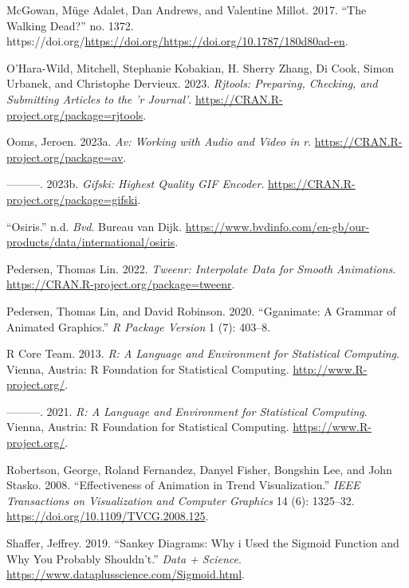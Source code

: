 \begin{CSLReferences}{1}{0}
\leavevmode{}%
McGowan, Müge Adalet, Dan Andrews, and Valentine Millot. 2017. {``The Walking Dead?''} no. 1372. https://doi.org/\url{https://doi.org/https://doi.org/10.1787/180d80ad-en}.

\leavevmode{}%
O'Hara-Wild, Mitchell, Stephanie Kobakian, H. Sherry Zhang, Di Cook, Simon Urbanek, and Christophe Dervieux. 2023. \emph{Rjtools: Preparing, Checking, and Submitting Articles to the 'r Journal'}. \url{https://CRAN.R-project.org/package=rjtools}.

\leavevmode{}%
Ooms, Jeroen. 2023a. \emph{Av: Working with Audio and Video in r}. \url{https://CRAN.R-project.org/package=av}.

\leavevmode{}%
---------. 2023b. \emph{Gifski: Highest Quality GIF Encoder}. \url{https://CRAN.R-project.org/package=gifski}.

\leavevmode{}%
{``Osiris.''} n.d. \emph{Bvd}. Bureau van Dijk. \url{https://www.bvdinfo.com/en-gb/our-products/data/international/osiris}.

\leavevmode{}%
Pedersen, Thomas Lin. 2022. \emph{Tweenr: Interpolate Data for Smooth Animations}. \url{https://CRAN.R-project.org/package=tweenr}.

\leavevmode{}%
Pedersen, Thomas Lin, and David Robinson. 2020. {``Gganimate: A Grammar of Animated Graphics.''} \emph{R Package Version} 1 (7): 403--8.

\leavevmode{}%
R Core Team. 2013. \emph{R: A Language and Environment for Statistical Computing}. Vienna, Austria: R Foundation for Statistical Computing. \url{http://www.R-project.org/}.

\leavevmode{}%
---------. 2021. \emph{R: A Language and Environment for Statistical Computing}. Vienna, Austria: R Foundation for Statistical Computing. \url{https://www.R-project.org/}.

\leavevmode{}%
Robertson, George, Roland Fernandez, Danyel Fisher, Bongshin Lee, and John Stasko. 2008. {``Effectiveness of Animation in Trend Visualization.''} \emph{IEEE Transactions on Visualization and Computer Graphics} 14 (6): 1325--32. \url{https://doi.org/10.1109/TVCG.2008.125}.

\leavevmode{}%
Shaffer, Jeffrey. 2019. {``Sankey Diagrams: Why i Used the Sigmoid Function and Why You Probably Shouldn't.''} \emph{Data + Science}. \url{https://www.dataplusscience.com/Sigmoid.html}.


\end{CSLReferences}
